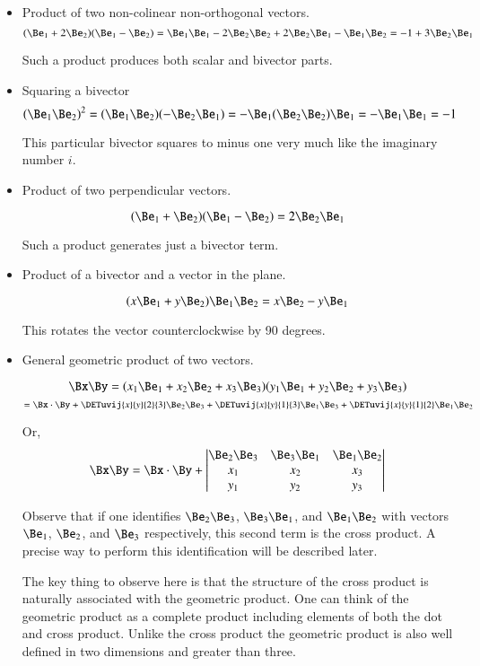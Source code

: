 \begin{itemize}
\item Product of two non-colinear non-orthogonal vectors.
\[
(\Be_1 + 2\Be_2) (\Be_1 - \Be_2)
= \Be_1\Be_1 -2\Be_2\Be_2 + 2\Be_2\Be_1 - \Be_1\Be_2
= -1 + 3\Be_2\Be_1 
\]

Such a product produces both scalar and bivector parts.

\item Squaring a bivector
\[
(\Be_1\Be_2)^2
=
(\Be_1\Be_2)(-\Be_2\Be_1)
=
-\Be_1(\Be_2\Be_2)\Be_1
=
-\Be_1\Be_1
=
-1
\]

This particular bivector squares to minus one very much like the imaginary number $i$.

\item Product of two perpendicular vectors.

\[
(\Be_1 + \Be_2) (\Be_1 - \Be_2) = 2\Be_2\Be_1
\]

Such a product generates just a bivector term.

\item Product of a bivector and a vector in the plane.

\[
(x\Be_1 + y\Be_2) \Be_1\Be_2
=
x\Be_2 - y\Be_1
\]

This rotates the vector counterclockwise by 90 degrees.

\item General  geometric product of two vectors.

\[
\Bx \By =
(x_1\Be_1
+x_2\Be_2
+x_3\Be_3)
(y_1\Be_1
+y_2\Be_2
+y_3\Be_3)
\]
\[
=
\Bx \cdot \By 
+\DETuvij{x}{y}{2}{3} \Be_2 \Be_3
+\DETuvij{x}{y}{1}{3} \Be_1 \Be_3
+\DETuvij{x}{y}{1}{2} \Be_1 \Be_2
\]

Or,
\[
\Bx \By =
\Bx \cdot \By +
\begin{vmatrix}
\Be_2\Be_3 & \Be_3\Be_1 & \Be_1\Be_2 \\
x_1 & x_2 & x_3 \\
y_1 & y_2 & y_3 \\
\end{vmatrix}
\]

Observe that if one identifies 
$\Be_2\Be_3$, $\Be_3\Be_1$, and $\Be_1\Be_2$ with vectors 
$\Be_1$,
$\Be_2$,
and $\Be_3$ respectively, this second term is the cross product.  A precise way to perform this identification will be described later.

The key thing to observe here is
that the structure of the cross product is naturally associated with the geometric product.  One can think of the geometric product
as a complete product including elements of both the dot and cross product.  Unlike the cross product the geometric product is also well defined
in two dimensions and greater than three.

\end{itemize}

